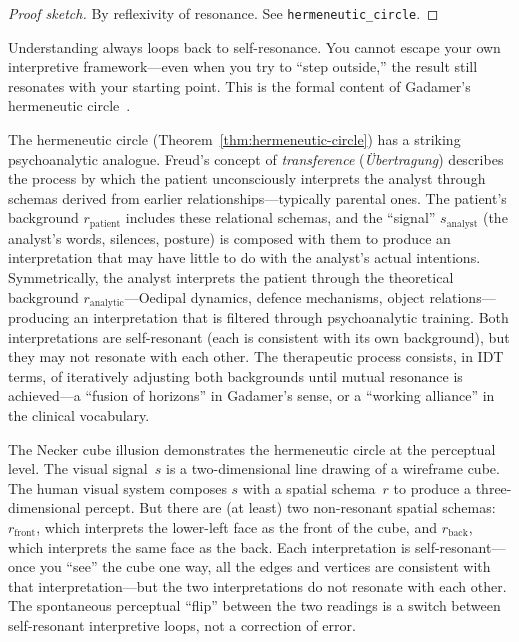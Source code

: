 \begin{proof}[Proof sketch]
By reflexivity of resonance.  See \texttt{hermeneutic\_circle}.
\end{proof}

\begin{remark}
Understanding always loops back to self-resonance.  You cannot escape
your own interpretive framework---even when you try to ``step outside,''
the result still resonates with your starting point.  This is the formal
content of Gadamer's hermeneutic circle~\cite{gadamer1960}.
\end{remark}

\begin{remark}
The hermeneutic circle (Theorem~\ref{thm:hermeneutic-circle}) has a
striking psychoanalytic analogue.  Freud's concept of
\emph{transference} (\textit{\"Ubertragung}) describes the process by
which the patient unconsciously interprets the analyst through schemas
derived from earlier relationships---typically parental ones.  The
patient's background $r_{\mathrm{patient}}$ includes these relational
schemas, and the ``signal'' $s_{\mathrm{analyst}}$ (the analyst's
words, silences, posture) is composed with them to produce an
interpretation that may have little to do with the analyst's actual
intentions.  Symmetrically, the analyst interprets the patient through
the theoretical background $r_{\mathrm{analytic}}$---Oedipal dynamics,
defence mechanisms, object relations---producing an interpretation that
is filtered through psychoanalytic training.  Both interpretations are
self-resonant (each is consistent with its own background), but they
may not resonate with each other.  The therapeutic process consists,
in IDT terms, of iteratively adjusting both backgrounds until mutual
resonance is achieved---a ``fusion of horizons'' in Gadamer's sense,
or a ``working alliance'' in the clinical vocabulary.
\end{remark}

\begin{example}
The Necker cube illusion demonstrates the hermeneutic circle at the
perceptual level.  The visual signal~$s$ is a two-dimensional line
drawing of a wireframe cube.  The human visual system composes $s$ with
a spatial schema~$r$ to produce a three-dimensional percept.  But there
are (at least) two non-resonant spatial schemas: $r_{\mathrm{front}}$,
which interprets the lower-left face as the front of the cube, and
$r_{\mathrm{back}}$, which interprets the same face as the back.  Each
interpretation is self-resonant---once you ``see'' the cube one way, all
the edges and vertices are consistent with that interpretation---but the
two interpretations do not resonate with each other.  The spontaneous
perceptual ``flip'' between the two readings is a switch between
self-resonant interpretive loops, not a correction of error.
\end{example}

